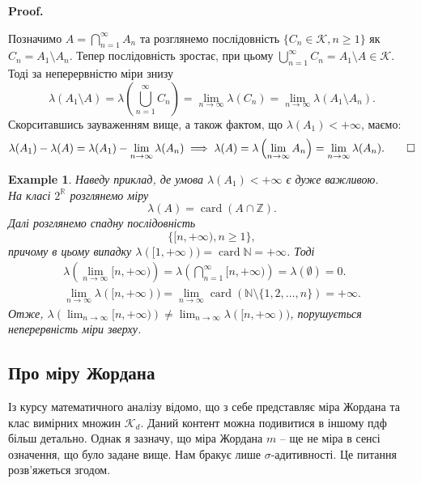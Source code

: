 \documentclass[a4paper, 10pt]{article}
\makeatletter
\theoremstyle{theoremdd}
\newtheorem{example}[theorem]{Example}
\DeclareMathOperator{\card}{card}
\renewenvironment{proof}[1][Proof.\\]{\par
\pushQED{\hfill \qed}%
\normalfont \topsep6\p@\@plus6\p@\relax
\trivlist
\item\relax
{\bfseries
#1\@addpunct{.}}\hspace\labelsep\ignorespaces
}{%
\popQED\endtrivlist\@endpefalse
}
\makeatother
\begin{document}
\begin{proof}
Позначимо $A = \displaystyle\bigcap_{n=1}^\infty A_n$ та розглянемо послідовність $\{C_n \in \mathcal{K}, n \geq 1\}$ як $C_n = A_1 \setminus A_n$. Тепер послідовність зростає, при цьому $\displaystyle\bigcup_{n=1}^\infty C_n = A_1 \setminus A \in \mathcal{K}$. Тоді за неперервністю міри знизу
\[
\lambda(A_1 \setminus A) = \displaystyle\lambda\left( \bigcup_{n=1}^\infty C_n \right) = \lim_{n \to \infty} \lambda\left(C_n\right) = \lim_{n \to \infty} \lambda(A_1 \setminus A_n).
\]
Скорситавшись зауваженням вище, а також фактом, що $\lambda(A_1) < +\infty$, маємо:
\begin{gather*}
\displaystyle\lambda(A_1) - \lambda(A) = \lambda(A_1) - \lim_{n \to \infty} \lambda(A_n) \implies \lambda(A) = \lambda\left( \lim_{n \to \infty} A_n \right) = \lim_{n \to \infty} \lambda(A_n). \qedhere
\end{gather*}
\end{proof}

\begin{example}
Наведу приклад, де умова $\lambda(A_1) < +\infty$ є дуже важливою.\\
На класі $2^{\mathbb{R}}$ розглянемо міру \[
\lambda(A) = \card (A \cap \mathbb{Z}).
\]
Далі розглянемо спадну послідовність \[
\{ [n,+\infty), n \geq 1 \},
\]
причому в цьому випадку $\lambda([1,+\infty)) = \card \mathbb{N} = +\infty$. Тоді
\begin{gather*}
\lambda\left( \lim_{n \to \infty} [n,+\infty) \right) = \lambda\left( \bigcap_{n=1}^\infty [n,+\infty) \right) = \lambda(\emptyset) = 0.\\
\lim_{n \to \infty} \lambda([n,+\infty)) = \lim_{n \to \infty} \card (\mathbb{N} \setminus \{1,2,\dots,n\}) = +\infty.
\end{gather*}
Отже, $\displaystyle\lambda\left( \lim_{n \to \infty} [n,+\infty) \right) \neq \lim_{n \to \infty} \lambda([n,+\infty))$, порушується неперервність міри зверху.
\end{example}

\subsection{Про міру Жордана}
Із курсу математичного аналізу відомо, що з себе представляє міра Жордана та клас вимірних множин $\mathcal{K}_d$. Даний контент можна подивитися в іншому пдф більш детально. Однак я зазначу, що міра Жордана $m$ -- ще не міра в сенсі означення, що було задане вище. Нам бракує лише $\sigma$-адитивності. Це питання розв'яжеться згодом.
\end{document}
